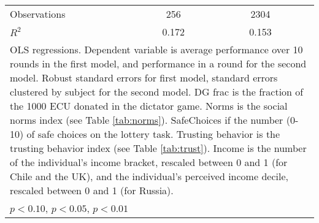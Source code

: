 {\begin{tabular}{l*{2}{cc}}
\hline
Observations    &      256         &         &     2304         &         \\
\(R^{2}\)       &    0.172         &         &    0.153         &         \\
\hline\hline
\multicolumn{5}{l}{\footnotesize OLS regressions. Dependent variable is average performance over 10 rounds in the first model, and performance in a round for the second model. Robust standard errors for first model, standard errors clustered by subject for the second model. DG frac is the fraction of the 1000 ECU donated in the dictator game. Norms is the social norms index (see Table \ref{tab:norms}). SafeChoices if the number (0-10) of safe choices on the lottery task. Trusting behavior is the trusting behavior index (see Table \ref{tab:trust}). Income is the number of the individual's income bracket, rescaled between 0 and 1 (for Chile and the UK), and the individual's perceived income decile, rescaled between 0 and 1 (for Russia).}\\
\multicolumn{5}{l}{\footnotesize \sym{*} \(p<0.10\), \sym{**} \(p<0.05\), \sym{***} \(p<0.01\)}\\
\end{tabular}
}
